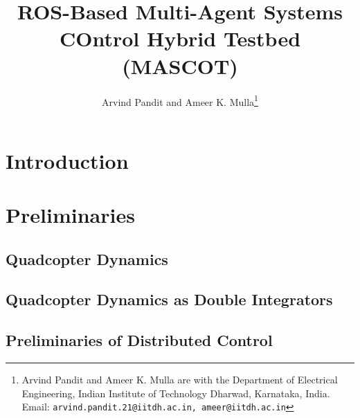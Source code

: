 \documentclass[letterpaper, 10 pt, conference]{ieeeconf}
\begin{document}
\title{ROS-Based \textbf{M}ulti-\textbf{A}gent \textbf{S}ystems \textbf{CO}ntrol Hybrid \textbf{T}estbed (MASCOT)}
\author{Arvind Pandit and Ameer K. Mulla\thanks{Arvind Pandit and Ameer K. Mulla are with the Department of Electrical Engineering, Indian Institute of Technology Dharwad, Karnataka, India. Email: \texttt{arvind.pandit.21@iitdh.ac.in, ameer@iitdh.ac.in}}}



\maketitle
\begin{abstract}


\end{abstract}


\section{Introduction}





\section{Preliminaries}\label{sec:prelim}


\subsection{Quadcopter Dynamics}\label{subsec:qd}


\subsection{Quadcopter Dynamics as Double Integrators}\label{subsec:di}


\subsection{Preliminaries of Distributed Control}
\end{document}
